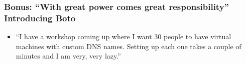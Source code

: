 \documentclass{beamer}
\begin{document}
\begin{frame}
  \frametitle{Bonus: ``With great power comes great
    responsibility''\\Introducing Boto}
  
  \begin{itemize}
  \item ``I have a workshop coming up where I want 30 people to have
    virtual machines with custom DNS names. Setting up each one takes
    a couple of minutes and I am very, very lazy.''
  \end{itemize}

\end{frame}
\end{document}
